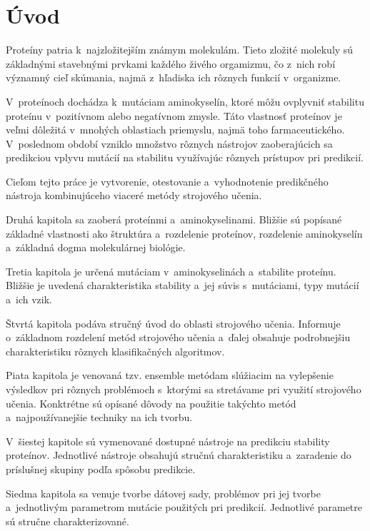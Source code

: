 
\chapter{Úvod}
Proteíny patria k~najzložitejším známym molekulám. Tieto zložité molekuly sú základnými stavebnými prvkami každého živého orgamizmu, čo z~nich robí významný cieľ skúmania, najmä z~hľadiska ich rôznych funkcií v~organizme.

V~proteínoch dochádza k~mutáciam aminokyselín, ktoré môžu ovplyvniť stabilitu proteínu v~pozitívnom alebo negatívnom zmysle. Táto vlastnosť proteínov je veľmi dôležitá v~mnohých oblastiach priemyslu, najmä toho farmaceutického. V~poslednom období vzniklo množstvo rôznych nástrojov zaoberajúcich sa predikciou vplyvu mutácií na stabilitu využívajúc rôznych prístupov pri predikcií.

Cieľom tejto práce je vytvorenie, otestovanie a~vyhodnotenie predikčného nástroja kombinujúceho viaceré metódy strojového učenia.

Druhá kapitola sa zaoberá proteínmi a~aminokyselinami. Bližšie sú popísané základné vlastnosti ako štruktúra a~rozdelenie proteínov, rozdelenie aminokyselín a~základná dogma molekulárnej biológie.

Tretia kapitola je určená mutáciam v~aminokyselinách a~stabilite proteínu. Bližšie je uvedená charakteristika stability a~jej súvis s~mutáciami, typy mutácií a~ich vzik.

Štvrtá kapitola podáva stručný úvod do oblasti strojového učenia. Informuje o~základnom rozdelení metód strojového učenia a~ďalej obsahuje podrobnejšiu charakteristiku rôznych klasifikačných algoritmov.

Piata kapitola je venovaná tzv. ensemble metódam slúžiacim na vylepšenie výsledkov pri rôznych problémoch s~ktorými sa stretávame pri využití strojového učenia. Konktrétne sú opísané dôvody na použitie takýchto metód a~najpoužívanejšie techniky na ich tvorbu.

V~šiestej kapitole sú vymenované dostupné nástroje na predikciu stability proteínov. Jednotlivé nástroje obsahujú stručnú charakteristiku a~zaradenie do príslušnej skupiny podľa spôsobu predikcie.

Siedma kapitola sa venuje tvorbe dátovej sady, problémov pri jej tvorbe a~jednotlivým parametrom mutácie použitých pri predikcií. Jednotlivé parametre sú stručne charakterizované.

